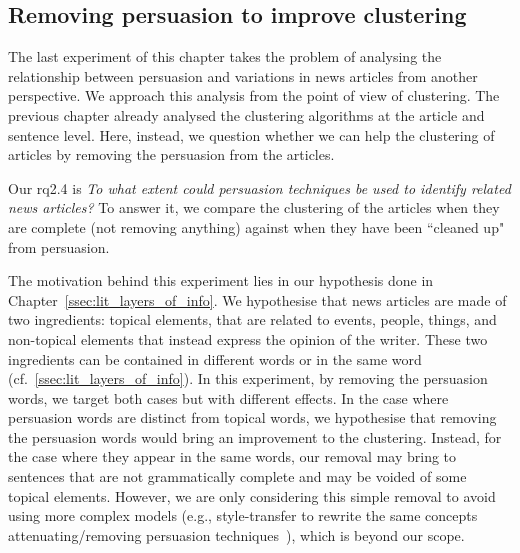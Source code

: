 \subsection{\statusgreen Removing persuasion to improve clustering}
\label{ssec:lp_relationship_removing}

The last experiment of this chapter takes the problem of analysing the relationship between persuasion and variations in news articles from another perspective.
We approach this analysis from the point of view of clustering.
The previous chapter already analysed the clustering algorithms at the article and sentence level.
Here, instead, we question whether we can help the clustering of articles by removing the persuasion from the articles.

Our \acrshort{rq}2.4 is \emph{To what extent could persuasion techniques be used to identify related news articles?}
To answer it, we compare the clustering of the articles when they are complete (not removing anything) against when they have been ``cleaned up" from persuasion.

The motivation behind this experiment lies in our hypothesis done in Chapter~\ref{ssec:lit_layers_of_info}. We hypothesise that news articles are made of two ingredients: topical elements, that are related to events, people, things, and non-topical elements that instead express the opinion of the writer. These two ingredients can be contained in different words or in the same word (cf.~\ref{ssec:lit_layers_of_info}).
In this experiment, by removing the persuasion words, we target both cases but with different effects.
In the case where persuasion words are distinct from topical words, we hypothesise that removing the persuasion words would bring an improvement to the clustering.
Instead, for the case where they appear in the same words, our removal may bring to sentences that are not grammatically complete and may be voided of some topical elements.
However, we are only considering this simple removal to avoid using more complex models
(e.g., style-transfer to rewrite the same concepts attenuating/removing persuasion techniques~\citep{bagdasaryan2022spinning}), which is beyond our scope. %


